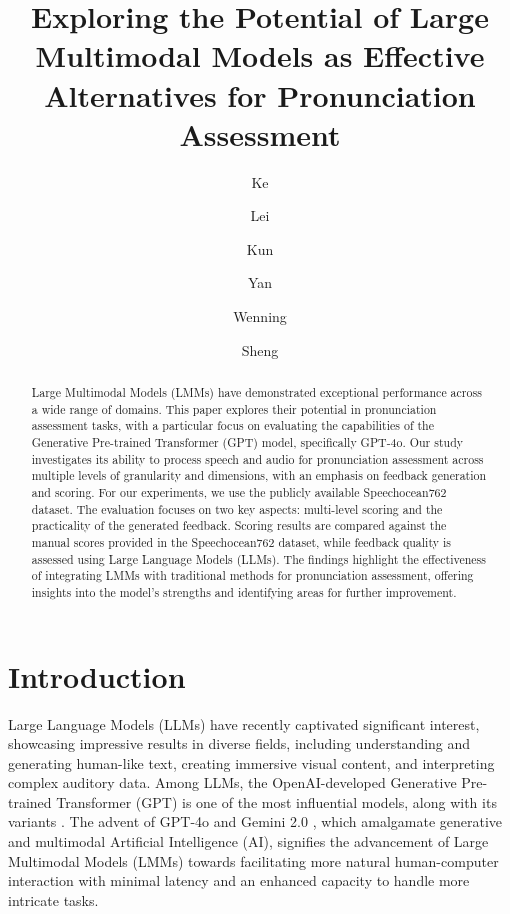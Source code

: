 \documentclass{Interspeech}
\title{Exploring the Potential of Large Multimodal Models as Effective Alternatives for Pronunciation Assessment}
\author[affiliation={1}]{Ke}{Wang}
\author[affiliation={1}]{Lei}{He}
\author[affiliation={1}]{Kun}{Liu}
\author[affiliation={1}]{Yan}{Deng}
\author[affiliation={1}]{Wenning}{Wei}
\author[affiliation={1}]{Sheng}{Zhao}
\affiliation{Microsoft}{Beijing}{China}
\begin{document}
\maketitle

\begin{abstract}

    Large Multimodal Models (LMMs) have demonstrated exceptional performance across a wide range of domains. This paper explores their potential in pronunciation assessment tasks, with a particular focus on evaluating the capabilities of the Generative Pre-trained Transformer (GPT) model, specifically GPT-4o. Our study investigates its ability to process speech and audio for pronunciation assessment across multiple levels of granularity and dimensions, with an emphasis on feedback generation and scoring. For our experiments, we use the publicly available Speechocean762 dataset. The evaluation focuses on two key aspects: multi-level scoring and the practicality of the generated feedback. Scoring results are compared against the manual scores provided in the Speechocean762 dataset, while feedback quality is assessed using Large Language Models (LLMs). The findings highlight the effectiveness of integrating LMMs with traditional methods for pronunciation assessment, offering insights into the model's strengths and identifying areas for further improvement.
\end{abstract}

\section{Introduction}

Large Language Models (LLMs) have recently captivated significant interest, showcasing impressive results in diverse fields, including understanding and generating human-like text, creating immersive visual content, and interpreting complex auditory data\cite{devlin2018bert,ramesh2021valle,openai2024sora,chen2022wavlm,wang2023valle}. Among LLMs, the OpenAI-developed Generative Pre-trained Transformer (GPT) \cite{radford2018gpt,radford2019gpt2,openai2020gpt3,openai2024gpt4} is one of the most influential models, along with its variants \cite{meta2024llama3,google024gemini,mistral2024pixtral12b,alibaba2024qwen25,deepseek2024deepseekv3}. The advent of GPT-4o \cite{openai2024gpt4o} and Gemini 2.0 \cite{google2024gemini20}, which amalgamate generative and multimodal Artificial Intelligence (AI), signifies the advancement of Large Multimodal Models (LMMs) towards facilitating more natural human-computer interaction with minimal latency and an enhanced capacity to handle more intricate tasks.
\end{document}
